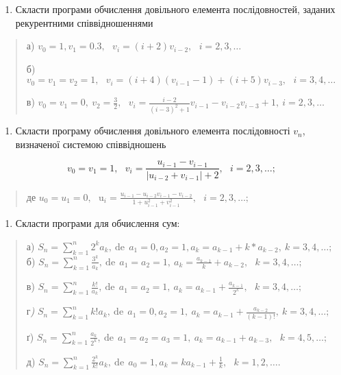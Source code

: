\documentclass[]{article}
\begin{document}
\begin{enumerate}
\def\labelenumi{\arabic{enumi})}
\item
  Скласти програми обчислення довільного елемента послідовностей,
  заданих рекурентними співвідношеннями
\end{enumerate}

\begin{quote}
а)
\(v_{0} = 1,v_{1} = 0.3,\mathrm{\text{\ \ \ \ \ \ \ \ }}v_{i} = (i + 2)v_{i - 2},\mathrm{\text{\ \ \ }}i = 2,3,\ldots\)

б)
\(v_{0} = v_{1} = v_{2} = 1,\mathrm{\text{\ \ \ \ \ \ \ \ }}v_{i} = (i + 4)(v_{i - 1} - 1) + (i + 5)v_{i - 3},\mathrm{\text{\ \ }}i = 3,4,\ldots\)

в)
\(v_{0} = v_{1} = 0,\ v_{2} = \frac{3}{2}\mathrm{,\ \ \ }v_{i} = \frac{i - 2}{(i - 3)^{2} + 1}v_{i - 1} - v_{i - 2}v_{i - 3} + 1,\ i = 2,3,\ldots\)
\end{quote}

\begin{enumerate}
\def\labelenumi{\arabic{enumi})}
\item
  Скласти програму обчислення довільного елемента послідовності
  \(v_{n}\), визначеної системою співвідношень
\end{enumerate}

\[v_{0} = v_{1} = 1,\mathrm{\text{\ \ \ \ }}v_{i} = \frac{u_{i - 1} - v_{i - 1}}{\left| u_{i - 2} + v_{i - 1} \right| + 2},\mathrm{\text{\ \ \ }}i = 2,3,\ldots;\]

\begin{quote}
де
\(u_{0} = u_{1} = 0,\mathrm{\text{\ \ \ \ }}\mathrm{u}_{i} = \frac{u_{i - 1} - u_{i - 2}v_{i - 1} - v_{i - 2}}{1 + u_{i - 1}^{2} + v_{i - 1}^{2}},\mathrm{\text{\ \ \ }}i = 2,3,\ldots;\)
\end{quote}

\begin{enumerate}
\def\labelenumi{\arabic{enumi})}
\item
  Скласти програми для обчислення сум:
\end{enumerate}

\begin{quote}
а)
\(S_{n} = \sum_{k = 1}^{n}{2^{k}a_{k}},\mathrm{\ de\ \ }a_{1} = 0,a_{2} = 1,a_{k} = a_{k - 1} + k*a_{k - 2},\ k = 3,4,\ldots;\)
б)
\(S_{n} = \sum_{k = 1}^{n}\frac{3^{k}}{a_{k}},\mathrm{\ de\ \ }a_{1} = a_{2} = 1,\ a_{k} = \frac{a_{k - 1}}{k} + a_{k - 2},\mathrm{\text{\ \ }}k = 3,4,\ldots;\)

в)
\(S_{n} = \sum_{k = 1}^{n}\frac{k!}{a_{k}},\mathrm{\ de\ \ }a_{1} = a_{2} = 1,\ a_{k} = a_{k - 1} + \frac{a_{k - 1}}{2^{k}},\mathrm{\text{\ \ }}k = 3,4,\ldots;\)

г\emph{)}
\(S_{n} = \sum_{k = 1}^{n}{k!a_{k}},\mathrm{\ de\ \ }a_{1} = 0,a_{2} = 1,\ a_{k} = a_{k - 1} + \frac{a_{k - 2}}{(k - 1)!},\ k = 3,4,\ldots;\)

ґ)
\(S_{n} = \sum_{k = 1}^{n}\frac{a_{k}}{2^{k}},\mathrm{\ de\ \ }a_{1} = a_{2} = a_{3} = 1,\ a_{k} = a_{k - 1} + a_{k - 3},\mathrm{\text{\ \ }}k = 4,5,\ldots;\)

д)
\(S_{n} = \sum_{k = 1}^{n}{\frac{2^{k}}{k!}a_{k}},\mathrm{\ de\ \ }a_{0} = 1,a_{k} = ka_{k - 1} + \frac{1}{k},\mathrm{\text{\ \ }}k = 1,2,\ldots.\)
\end{quote}
\end{document}

